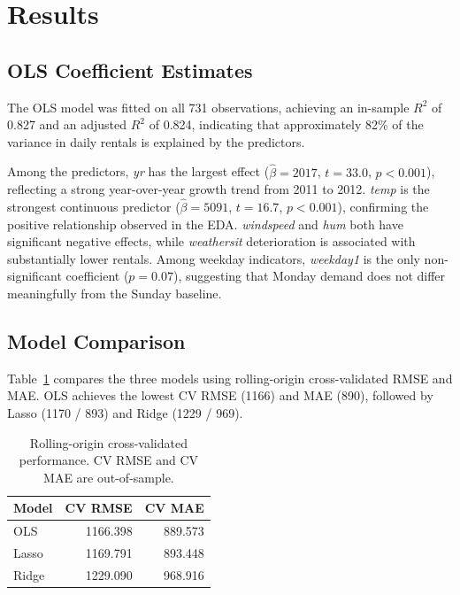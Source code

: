 \documentclass[12pt, a4paper]{article}
\begin{document}
\section{Results}

\subsection{OLS Coefficient Estimates}
 
The OLS model was fitted on all 731 observations, achieving an in-sample
$R^2$ of 0.827 and an adjusted $R^2$ of 0.824, indicating that
approximately 82\% of the variance in daily rentals is explained by the
predictors.

Among the predictors, \textit{yr} has the largest effect ($\hat{\beta} = 2017$, $t = 33.0$,
$p < 0.001$), reflecting a strong year-over-year growth trend from 2011
to 2012. \textit{temp} is the strongest continuous predictor
($\hat{\beta} = 5091$, $t = 16.7$, $p < 0.001$), confirming the positive
relationship observed in the EDA. \textit{windspeed} and \textit{hum}
both have significant negative effects, while \textit{weathersit}
deterioration is associated with substantially lower rentals. Among
weekday indicators, \textit{weekday1} is the only non-significant
coefficient ($p = 0.07$), suggesting that Monday demand does not differ
meaningfully from the Sunday baseline.

\subsection{Model Comparison}

Table~\ref{tab:model_compare} compares the three models using
rolling-origin cross-validated RMSE and MAE. OLS achieves the lowest
CV RMSE (1166) and MAE (890), followed by Lasso (1170 / 893) and Ridge
(1229 / 969).

\begin{table}[H]
\centering
\caption{Rolling-origin cross-validated performance. CV RMSE and CV MAE
are out-of-sample.}
\label{tab:model_compare}
\begin{tabular}{lrr}
\toprule
\textbf{Model} & \textbf{CV RMSE} & \textbf{CV MAE} \\
\midrule
OLS   & 1166.398 & 889.573 \\
Lasso & 1169.791 & 893.448 \\
Ridge & 1229.090 & 968.916 \\
\bottomrule
\end{tabular}
\end{table}
\end{document}
